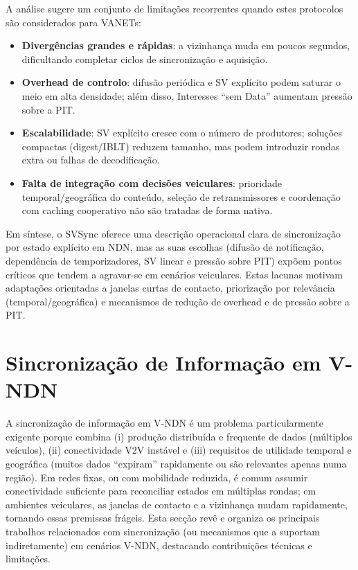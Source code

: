 A análise sugere um conjunto de limitações recorrentes quando estes protocolos são considerados para \gls{VANETs}:

\begin{itemize}
    \item \textbf{Divergências grandes e rápidas}: a vizinhança muda em poucos segundos, dificultando completar ciclos de sincronização e aquisição.
    \item \textbf{Overhead de controlo}: difusão periódica e SV explícito podem saturar o meio em alta densidade; além disso, Interesses “sem Data” aumentam pressão sobre a PIT.
    \item \textbf{Escalabilidade}: SV explícito cresce com o número de produtores; soluções compactas (digest/IBLT) reduzem tamanho, mas podem introduzir rondas extra ou falhas de decodificação.
    \item \textbf{Falta de integração com decisões veiculares}: prioridade temporal/geográfica do conteúdo, seleção de retransmissores e coordenação com caching cooperativo não são tratadas de forma nativa.
\end{itemize}

Em síntese, o \gls{SVSync} oferece uma descrição operacional clara de sincronização por estado explícito em \gls{NDN}, mas as suas escolhas (difusão de notificação, dependência de temporizadores, SV linear e pressão sobre PIT) expõem pontos críticos que tendem a agravar-se em cenários veiculares. Estas lacunas motivam adaptações orientadas a janelas curtas de contacto, priorização por relevância (temporal/geográfica) e mecanismos de redução de overhead e de pressão sobre a \gls{PIT}.


\section{Sincronização de Informação em \gls{V-NDN}}
\label{sec:sync-vndn}

A sincronização de informação em \gls{V-NDN} é um problema particularmente exigente porque combina (i) produção distribuída e frequente de dados (múltiplos veículos), (ii) conectividade \gls{V2V} instável e (iii) requisitos de utilidade temporal e geográfica (muitos dados “expiram” rapidamente ou são relevantes apenas numa região). Em redes fixas, ou com mobilidade reduzida, é comum assumir conectividade suficiente para reconciliar estados em múltiplas rondas; em ambientes veiculares, as janelas de contacto e a vizinhança mudam rapidamente, tornando essas premissas frágeis. Esta secção revê e organiza os principais trabalhos relacionados com sincronização (ou mecanismos que a suportam indiretamente) em cenários \gls{V-NDN}, destacando contribuições técnicas e limitações.

